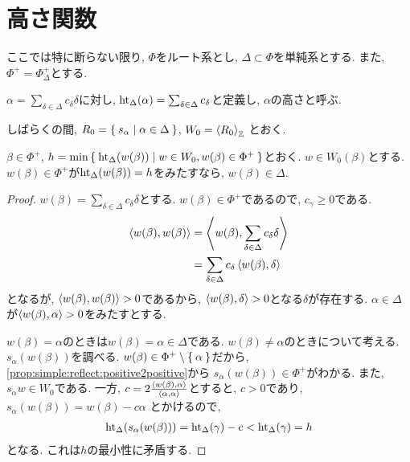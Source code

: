 \section{高さ関数}
ここでは特に断らない限り,
$\Phi$をルート系とし, $\Delta\subset\Phi$を単純系とする.
また, $\Phi^+=\Phi_\Delta^+$とする.
\begin{definition}
  $\alpha=\sum_{\delta\in\Delta}c_\delta \delta$に対し,
  $\operatorname{ht}_\Delta(\alpha)=\sum_{\delta\in\Delta}c_\delta$と定義し,
  $\alpha$の高さと呼ぶ.
\end{definition}

しばらくの間,
$R_0=\Set{s_\alpha|\alpha\in\Delta}$,
$W_0=\Braket{R_0}_{\mathbb{Z}}$
とおく.
\begin{lemma}
  \label{lem:minimumhtissimple}
  $\beta\in\Phi^+$,
  $h=\min\Set{\operatorname{ht}_\Delta(w(\beta))|w\in W_0, w(\beta)\in \Phi^+}$とおく.
  $w\in W_0(\beta)$とする.
  $w(\beta)\in\Phi^+$が$\operatorname{ht}_\Delta(w(\beta))=h$をみたすなら,
  $w(\beta)\in\Delta$.
\end{lemma}
\begin{proof}
  $w(\beta)=\sum_{\delta\in\Delta}c_\delta\delta$とする.
  $w(\beta)\in\Phi^+$であるので,
  $c_\gamma\geq 0$である.
  \begin{align*}
    \Braket{w(\beta),w(\beta)}
    &=\Braket{w(\beta),\sum_{\delta\in\Delta}c_\delta\delta}\\
    &=\sum_{\delta\in\Delta}c_\delta\Braket{w(\beta),\delta}
  \end{align*}
  となるが, $\Braket{w(\beta),w(\beta)}>0$であるから,
  $\Braket{w(\beta),\delta}>0$となる$\delta$が存在する.
  $\alpha\in\Delta$が$\Braket{w(\beta),\alpha}>0$をみたすとする.

  $w(\beta)=\alpha$のときは$w(\beta)=\alpha\in\Delta$である.
  $w(\beta)\neq\alpha$のときについて考える.
  $s_\alpha(w(\beta))$を調べる.
  $w(\beta)\in\Phi^+\setminus\Set{\alpha}$だから,
  \cref{prop:simple:reflect:positive2positive}から
  $s_\alpha(w(\beta))\in\Phi^+$がわかる.
  また, $s_\alpha w\in W_0$である.
  一方,  
  $c=2\frac{\Braket{w(\beta),\alpha}}{\Braket{\alpha,\alpha}}$とすると,
  $c>0$であり,
  $s_\alpha(w(\beta))=w(\beta)-c\alpha$
  とかけるので,
  \begin{align*}
    \operatorname{ht}_\Delta(s_\alpha(w(\beta)))
    =\operatorname{ht}_\Delta(\gamma)-c < \operatorname{ht}_\Delta(\gamma)=h
  \end{align*}
  となる.
  これは$h$の最小性に矛盾する.
\end{proof}


